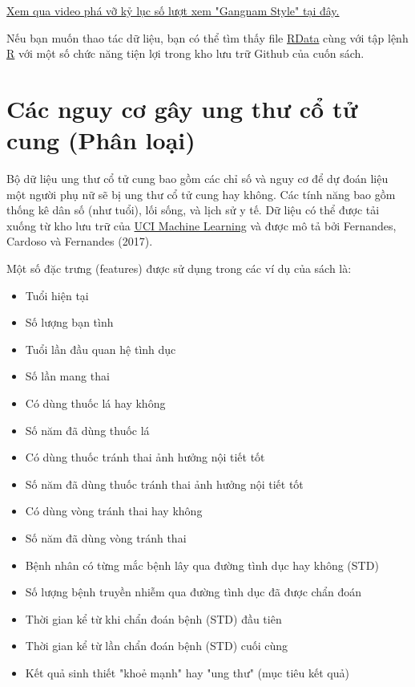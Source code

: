 \href{https://www.youtube.com/watch?v=9bZkp7q19f0&feature=player_embedded}{Xem qua video phá vỡ kỷ lục số lượt xem "Gangnam Style" tại đây.}

Nếu bạn muốn thao tác dữ liệu, bạn có thể tìm thấy file \href{https://github.com/christophM/interpretable-ml-book/blob/master/data/ycomments.RData}{RData} cùng với tập lệnh \href{https://github.com/christophM/interpretable-ml-book/blob/master/R/get-SpamTube-dataset.R}{R} với một số chức năng tiện lợi trong kho lưu trữ Github của cuốn sách.




\clearpage 

\section{Các nguy cơ gây ung thư cổ tử cung (Phân loại)} \label{chap_3.3}
Bộ dữ liệu ung thư cổ tử cung bao gồm các chỉ số và nguy cơ để dự đoán liệu một người phụ nữ sẽ bị ung thư cổ tử cung hay không. Các tính năng bao gồm thống kê dân số (như tuổi), lối sống, và lịch sử y tế. Dữ liệu có thể được tải xuống từ kho lưu trữ của \href{https://archive.ics.uci.edu/ml/datasets/Cervical+cancer+\%28Risk+Factors\%29}{UCI Machine Learning} và được mô tả bởi Fernandes, Cardoso và Fernandes (2017).

Một số đặc trưng (features) được sử dụng trong các ví dụ của sách là: 
\begin{itemize} 
    \item Tuổi hiện tại
    \item Số lượng bạn tình
    \item Tuổi lần đầu quan hệ tình dục
    \item Số lần mang thai
    \item Có dùng thuốc lá hay không
    \item Số năm đã dùng thuốc lá
    \item Có dùng thuốc tránh thai ảnh hưởng nội tiết tốt
    \item Số năm đã dùng thuốc tránh thai ảnh hưởng nội tiết tốt
    \item Có dùng vòng tránh thai hay không
    \item Số năm đã dùng vòng tránh thai
    \item Bệnh nhân có từng mắc bệnh lây qua đường tình dục hay không (STD)
    \item Số lượng bệnh truyền nhiễm qua đường tình dục đã được chẩn đoán
    \item Thời gian kể từ khi chẩn đoán bệnh (STD) đầu tiên
    \item Thời gian kể từ lần chẩn đoán bệnh (STD) cuối cùng
    \item Kết quả sinh thiết "khoẻ mạnh" hay "ung thư" (mục tiêu kết quả)
\end{itemize}

